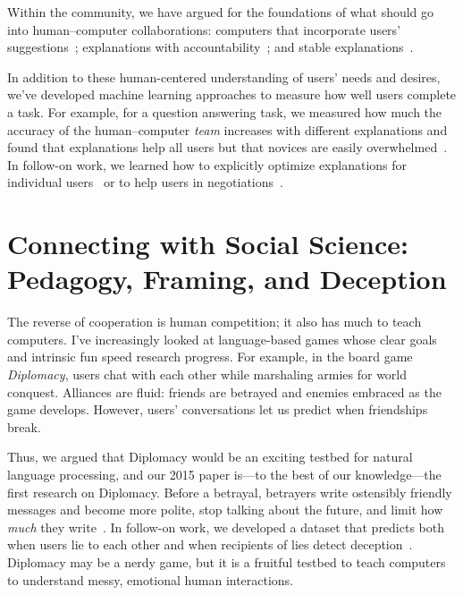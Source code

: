 Within the  community, we have argued for the foundations of
what should go into human--computer collaborations: computers that incorporate
users' suggestions~\cite{kumar-19}; explanations with
accountability~\cite{smith-20}; and stable
explanations~\cite{smith-20:adherence}.

In addition to these human-centered understanding of users' needs and
desires, we've developed machine learning approaches to measure how
well users complete a task.
%
For example, for a question answering task, we measured how much the
accuracy of the human--computer \emph{team} increases with different
explanations and found that explanations help all users but that
novices are easily overwhelmed~\cite{feng-19}.
%
In follow-on work, we learned how to explicitly optimize explanations
for individual users~\cite{feng-22} or to help users in negotiations~\cite{Gu:Wongkamjan:Kummerfeld:Peskoff:May:Boyd-Graber-2025}.


\section{Connecting with Social Science: Pedagogy, Framing, and Deception}

The reverse of cooperation is human competition; it also has much to
teach computers.
%
I've increasingly looked at language-based games whose clear goals and
intrinsic fun speed research progress.
%
For example, in the board game \emph{Diplomacy}, users
chat with each other while marshaling armies for world conquest. Alliances are
fluid: friends are betrayed and enemies embraced as the game develops.
%
However,
users' conversations let us predict when friendships break.

Thus, we argued that Diplomacy would be an exciting testbed for
natural language processing, and our 2015 paper is---to the best of
our knowledge---the first  research on Diplomacy.
%
Before a betrayal, betrayers write ostensibly friendly messages and become more polite, stop talking about the future, and limit how \emph{much} they write~\cite{niculae-15}.
%
In follow-on work, we developed a dataset that predicts both when users
lie to each other and when recipients of lies detect
deception~\cite{Peskov-20}.
%
Diplomacy may be a nerdy game, but it is a fruitful testbed to teach
computers to understand messy, emotional human interactions.


